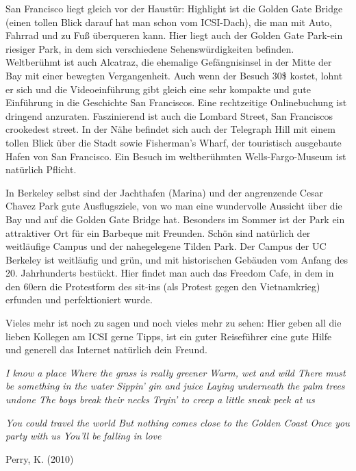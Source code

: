 \documentclass[a4paper]{scrreprt}
\begin{document}
San Francisco liegt gleich vor der Haustür: Highlight ist die Golden Gate Bridge (einen tollen Blick darauf hat man schon vom ICSI-Dach), die man mit Auto, Fahrrad und zu Fuß überqueren kann. Hier liegt auch der Golden Gate Park-ein riesiger Park, in dem sich verschiedene Sehenswürdigkeiten befinden. Weltberühmt ist auch Alcatraz, die ehemalige Gefängnisinsel in der Mitte der Bay mit einer bewegten Vergangenheit. Auch wenn der Besuch 30\$ kostet, lohnt er sich und die Videoeinführung gibt gleich eine sehr kompakte und gute Einführung in die Geschichte San Franciscos. Eine rechtzeitige Onlinebuchung ist dringend anzuraten. Faszinierend ist auch die Lombard Street, San Franciscos crookedest street. In der Nähe befindet sich auch der Telegraph Hill mit einem tollen Blick über die Stadt sowie Fisherman's Wharf, der touristisch ausgebaute Hafen von San Francisco. Ein Besuch im weltberühmten Wells-Fargo-Museum ist natürlich Pflicht.

In Berkeley selbst sind der Jachthafen (Marina) und der angrenzende Cesar Chavez Park gute Ausflugsziele, von wo man eine wundervolle Aussicht über die Bay und auf die Golden Gate Bridge hat. Besonders im Sommer ist der Park ein attraktiver Ort für ein Barbeque mit Freunden. Schön sind natürlich der weitläufige Campus und der nahegelegene Tilden Park. Der Campus der UC Berkeley ist weitläufig und grün, und mit historischen Gebäuden vom Anfang des 20. Jahrhunderts bestückt. Hier findet man auch das Freedom Cafe, in dem in den 60ern die Protestform des sit-ins (als Protest gegen den Vietnamkrieg) erfunden und perfektioniert wurde.

Vieles mehr ist noch zu sagen und noch vieles mehr zu sehen: Hier geben all die lieben Kollegen am ICSI gerne Tipps, ist ein guter Reiseführer eine gute Hilfe und generell das Internet natürlich dein Freund.

\clearpage

 

\begin{center}
\textit{I know a place
Where the grass is really greener
Warm, wet and wild
There must be something in the water
Sippin' gin and juice
Laying underneath the palm trees undone
The boys break their necks
Tryin' to creep a little sneak peek at us}

\textit{You could travel the world
But nothing comes close to the Golden Coast
Once you party with us
You'll be falling in love}

Perry, K. (2010)
\end{center}
\end{document}
